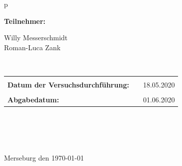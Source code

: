 \begin{center}
\begin{tabular}{p{\textwidth}}

\begin{center}
\Large{\textbf{Teilnehmer:}} \\ 
\end{center}
\begin{center}
\large{Willy Messerschmidt \\
	Roman-Luca Zank} \\
\end{center}


\\

\begin{center}
\begin{tabular}{lll}
&&\\
\large{\textbf{Datum der Versuchsdurchführung:}}&& \large{18.05.2020}\\
&&\\
\large{\textbf{Abgabedatum:}}&& \large{01.06.2020}
\end{tabular}
\end{center}

\\ \\ \\ \\
\large{Merseburg den \today}

\end{tabular}
\end{center}
